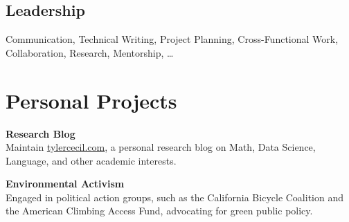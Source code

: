 \documentclass{tc_cv}
\begin{document}
\begin{minipage}[t]{0.3\linewidth}
  \vspace{0.25em}
  \subsection{Leadership}
  Communication,
  Technical Writing,
  Project Planning,
  Cross-Functional Work,
  Collaboration,
  Research,
  Mentorship,
  \ldots

  \vspace{1.5em}
  \section{Personal Projects}
  \textbf{Research Blog}\\
  Maintain \href{https://tylercecil.com}{\ul{tylercecil.com}}, a personal
  research blog on Math, Data Science, Language, and other academic interests.

  \vspace{0.5em}
  \textbf{Environmental Activism}\\
  Engaged in political action groups, such as the California Bicycle Coalition
  and the American Climbing Access Fund, advocating for green public policy.

\end{minipage}
\hfill\vline\hfill
\end{document}
